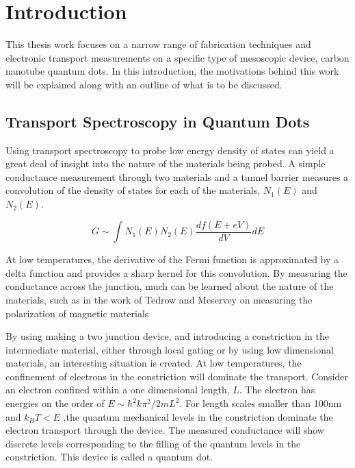 \chapter{Introduction}
\label{sec:intro}

This thesis work focuses on a narrow range of fabrication techniques and electronic transport measurements on a specific type of mesoscopic device, carbon nanotube quantum dots. In this introduction, the motivations behind this work will be explained along with an outline of what is to be discussed. 

\section{Transport Spectroscopy in Quantum Dots}

Using transport spectroscopy to probe low energy density of states can yield a great deal of insight into the nature of the materials being probed. A simple conductance measurement through two materials and a tunnel barrier measures a convolution of the density of states for each of the materials, $N_1(E)$ and $N_2(E)$.

\begin{equation}
    \label{eq:conductance}
    G \sim \int N_1(E) N_2(E)\frac{df(E+eV)}{dV}dE
\end{equation}

At low temperatures, the derivative of the Fermi function is approximated by a delta function and provides a sharp kernel for this convolution. By measuring the conductance across the junction, much can be learned about the nature of the materials, such as in the work of Tedrow and Meservey on measuring the polarization of magnetic materials \cite{Tedrow1971}

By using making a two junction device, and introducing a constriction in the intermediate material, either through local gating or by using low dimensional materials, an interesting situation is created. At low temperatures, the confinement of electrons in the constriction will dominate the transport. Consider an electron confined within a one dimensional length, $L$. The electron has energies on the order of $E \sim \hbar^2k \pi^2/2mL^2$. For length scales smaller than 100nm and $k_B T < E$ ,the quantum mechanical levels in the constriction dominate the electron transport through the device. The measured conductance will show discrete levels corresponding to the filling of the quantum levels in the constriction. This device is called a quantum dot.

